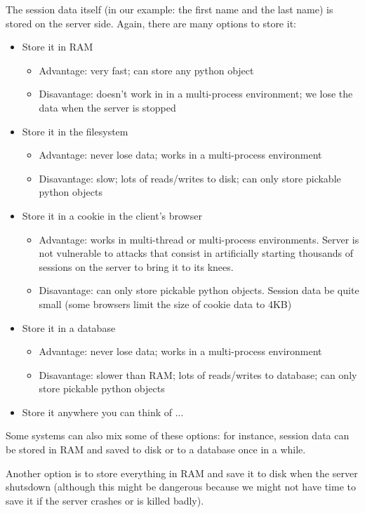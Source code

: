 \documentclass{manual}
\begin{document}
The session data itself (in our example: the first name and the last name) is stored on the server side.
Again, there are many options to store it:
\begin{itemize}
\item
Store it in RAM
    \begin{itemize}
    \item
    Advantage: very fast; can store any python object
    \item
    Disavantage: doesn't work in in a multi-process environment; we lose the data when the server is stopped
    \end{itemize}
\item
Store it in the filesystem
    \begin{itemize}
    \item
    Advantage: never lose data; works in a multi-process environment
    \item
    Disavantage: slow; lots of reads/writes to disk; can only store pickable python objects
    \end{itemize}
\item
Store it in a cookie in the client's browser
    \begin{itemize}
    \item
    Advantage: works in multi-thread or multi-process environments. Server is not vulnerable to attacks that consist in artificially starting thousands of sessions on the server to bring it to its knees.
    \item
    Disavantage: can only store pickable python objects. Session data  be quite small (some browsers limit the size of cookie data to 4KB)
    \end{itemize}
\item
Store it in a database
    \begin{itemize}
    \item
    Advantage: never lose data; works in a multi-process environment
    \item
    Disavantage: slower than RAM; lots of reads/writes to database; can only store pickable python objects
    \end{itemize}
\item
Store it anywhere you can think of ...
\end{itemize}

Some systems can also mix some of these options: for instance, session data can be stored in RAM and saved to disk or 
to a database once in a while.

Another option is to store everything in RAM and save it to disk when the server shutsdown (although this might be dangerous
because we might not have time to save it if the server crashes or is killed badly).
\end{document}
